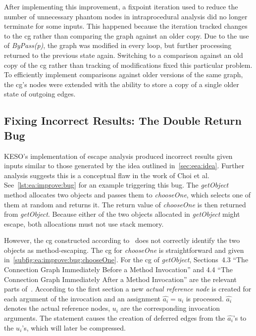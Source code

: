 			After implementing this improvement, a fixpoint iteration used to reduce the number of unnecessary phantom nodes
			in intraprocedural analysis did no longer terminate for some inputs. This happened because the iteration tracked
			changes to the \gls{cg} rather than comparing the graph against an older copy. Due to the use of \emph{ByPass(p)},
			the graph was modified in every loop, but further processing returned to the previous state again. Switching to
			a comparison against an old copy of the \gls{cg} rather than tracking of modifications fixed this particular
			problem. To efficiently implement comparisons against older versions of the same graph, the \acrlong{cg}'s nodes
			were extended with the ability to store a copy of a single older state of outgoing edges.

		\subsection{Fixing Incorrect Results: The Double Return Bug}
			\label{subsec:ea:improve:bug}
			KESO's implementation of escape analysis produced incorrect results given inputs similar to those generated by the
			idea outlined in~\cref{sec:eea:idea}. Further analysis suggests this is a conceptual flaw in the work of Choi et
			al. See~\cref{lst:ea:improve:bug} for an example triggering this bug. The \emph{getObject} method allocates two
			objects and passes them to \emph{chooseOne}, which selects one of them at random and returns it. The return value
			of \emph{chooseOne} is then returned from \emph{getObject}. Because either of the two objects allocated in
			\emph{getObject} might escape, both allocations must not use stack memory.


			However, the \gls{cg} constructed according to~\cite[Sec.~4]{choi:03:toplas} does not correctly identify the two
			objects as method-escaping. The \acrlong{cg} for \emph{chooseOne} is straightforward and given
			in~\cref{subfig:ea:improve:bug:chooseOne}. For the \gls{cg} of \emph{getObject}, Sections~4.3 \enquote{The
			Connection Graph Immediately Before a Method Invocation} and 4.4 \enquote{The Connection Graph Immediately After
			a Method Invocation} are the relevant parts of~\cite{choi:03:toplas}. According to the first section a new
			\emph{actual reference node} is created for each argument of the invocation and an assignment $\hat{a_i} = u_i$ is
			processed. $\hat{a_i}$ denotes the actual reference nodes, $u_i$ are the corresponding invocation arguments. The
			statement causes the creation of deferred edges from the $\hat{a_i}$'s to the $u_i$'s, which will later be
			compressed.

